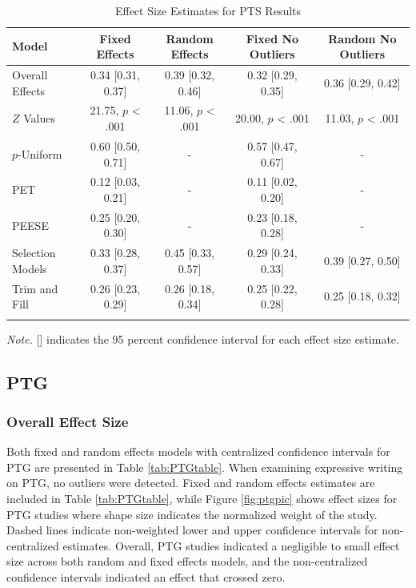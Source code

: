 \documentclass[english,man]{apa6}
\theoremstyle{definition}
\theoremstyle{definition}
\theoremstyle{definition}
\theoremstyle{remark}
\begin{document}
\begin{table}[tbp]
\begin{center}
\begin{threeparttable}
\caption{\label{tab:PTStable}Effect Size Estimates for PTS Results}
\small{
\begin{tabular}{lcccc}
\toprule
Model & Fixed Effects & Random Effects & Fixed No Outliers & Random No Outliers\\
\midrule
Overall Effects & 0.34 [0.31, 0.37] & 0.39 [0.32, 0.46] & 0.32 [0.29, 0.35] & 0.36 [0.29, 0.42]\\
$Z$ Values & 21.75, $p$ < .001 & 11.06, $p$ < .001 & 20.00, $p$ < .001 & 11.03, $p$ < .001\\
$p$-Uniform & 0.60 [0.50, 0.71] & - & 0.57 [0.47, 0.67] & -\\
PET & 0.12 [0.03, 0.21] & - & 0.11 [0.02, 0.20] & -\\
PEESE & 0.25 [0.20, 0.30] & - & 0.23 [0.18, 0.28] & -\\
Selection Models & 0.33 [0.28, 0.37] & 0.45 [0.33, 0.57] & 0.29 [0.24, 0.33] & 0.39 [0.27, 0.50]\\
Trim and Fill & 0.26 [0.23, 0.29] & 0.26 [0.18, 0.34] & 0.25 [0.22, 0.28] & 0.25 [0.18, 0.32]\\
\bottomrule
\addlinespace
\end{tabular}
}
\begin{tablenotes}[para]
\textit{Note.} [] indicates the 95 percent confidence interval for each effect size estimate.
\end{tablenotes}
\end{threeparttable}
\end{center}
\end{table}

\subsection{PTG}\label{ptg}

\subsubsection{Overall Effect Size}\label{overall-effect-size-1}

Both fixed and random effects models with centralized confidence
intervals for PTG are presented in Table \ref{tab:PTGtable}. When
examining expressive writing on PTG, no outliers were detected. Fixed
and random effects estimates are included in Table \ref{tab:PTGtable},
while Figure \ref{fig:ptgpic} shows effect sizes for PTG studies where
shape size indicates the normalized weight of the study. Dashed lines
indicate non-weighted lower and upper confidence intervals for
non-centralized estimates. Overall, PTG studies indicated a negligible
to small effect size across both random and fixed effects models, and
the non-centralized confidence intervals indicated an effect that
crossed zero.
\end{document}
